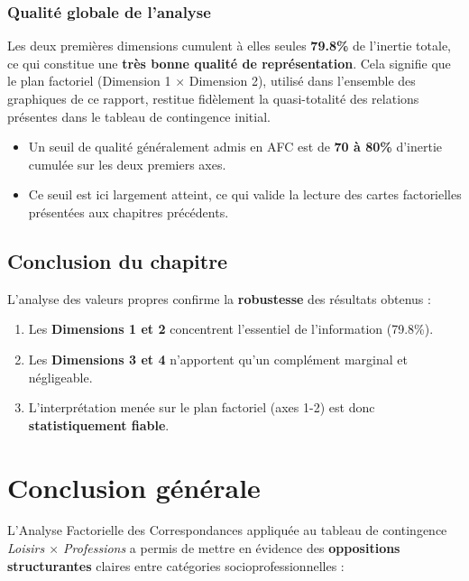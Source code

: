 \documentclass[12pt,a4paper]{book}
\begin{document}
	\subsection{Qualité globale de l'analyse}
	
	Les deux premières dimensions cumulent à elles seules \textbf{79.8\%} de l'inertie totale, ce qui constitue une \textbf{très bonne qualité de représentation}. Cela signifie que le plan factoriel (Dimension 1 $\times$ Dimension 2), utilisé dans l'ensemble des graphiques de ce rapport, restitue fidèlement la quasi-totalité des relations présentes dans le tableau de contingence initial.
	
	\begin{itemize}
		\item Un seuil de qualité généralement admis en AFC est de \textbf{70 à 80\%} d'inertie cumulée sur les deux premiers axes.
		\item Ce seuil est ici largement atteint, ce qui valide la lecture des cartes factorielles présentées aux chapitres précédents.
	\end{itemize}
	
	\section{Conclusion du chapitre}
	
	L'analyse des valeurs propres confirme la \textbf{robustesse} des résultats obtenus :
	
	\begin{enumerate}
		\item Les \textbf{Dimensions 1 et 2} concentrent l'essentiel de l'information (79.8\%).
		\item Les \textbf{Dimensions 3 et 4} n'apportent qu'un complément marginal et négligeable.
		\item L'interprétation menée sur le plan factoriel (axes 1-2) est donc \textbf{statistiquement fiable}.
	\end{enumerate}
	
	\chapter*{Conclusion générale}
	
	L'Analyse Factorielle des Correspondances appliquée au tableau de contingence \textit{Loisirs $\times$ Professions} a permis de mettre en évidence des \textbf{oppositions structurantes} claires entre catégories socioprofessionnelles :
	
\end{document}
